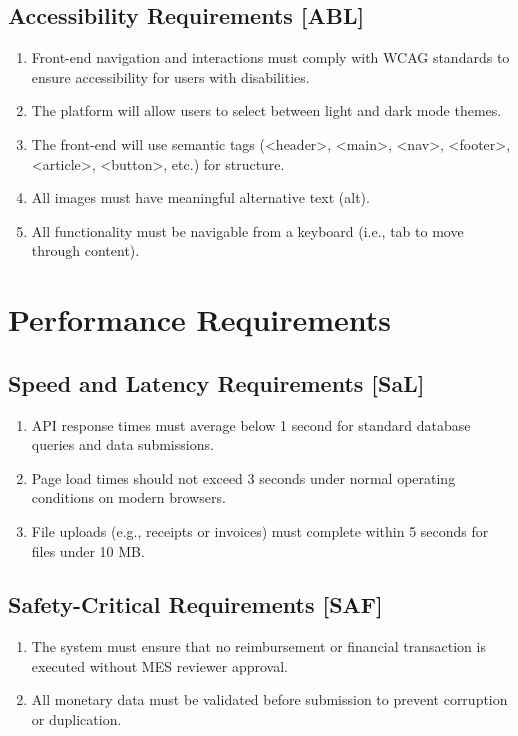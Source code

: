 \documentclass[12pt]{article}
\begin{document}
\begin{enumerate}
  \subsection{Accessibility Requirements [ABL]}
    \begin{enumerate}
      \item Front-end navigation and interactions must comply with WCAG standards to ensure accessibility for users with disabilities.
      \item The platform will allow users to select between light and dark mode themes.
      \item The front-end will use semantic tags (<header>, <main>, <nav>, <footer>, <article>, <button>, etc.) for structure.
      \item All images must have meaningful alternative text (alt).
      \item All functionality must be navigable from a keyboard (i.e., tab to move through content).
    \end{enumerate}

\section{Performance Requirements}
  \subsection{Speed and Latency Requirements [SaL]}
    \begin{enumerate}
        \item API response times must average below 1 second for standard database queries and data submissions.
        \item Page load times should not exceed 3 seconds under normal operating conditions on modern browsers.
        \item File uploads (e.g., receipts or invoices) must complete within 5 seconds for files under 10 MB.
    \end{enumerate}

  \subsection{Safety-Critical Requirements [SAF]}
    \begin{enumerate}
        \item The system must ensure that no reimbursement or financial transaction is executed without MES reviewer approval.
        \item All monetary data must be validated before submission to prevent corruption or duplication.
    \end{enumerate}


\end{enumerate}
\end{document}
